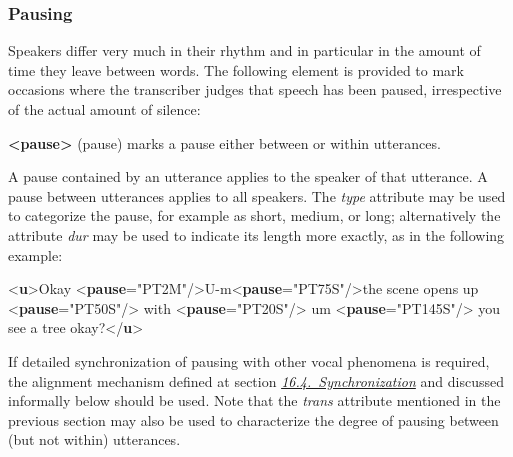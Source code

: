 \subsubsection[{Pausing}]{Pausing}\label{TSBAPA}\par
Speakers differ very much in their rhythm and in particular in the amount of time they leave between words. The following element is provided to mark occasions where the transcriber judges that speech has been paused, irrespective of the actual amount of silence: 
\begin{sansreflist}
  
\item [\textbf{<pause>}] (pause) marks a pause either between or within utterances.
\end{sansreflist}
 A pause contained by an utterance applies to the speaker of that utterance. A pause between utterances applies to all speakers. The {\itshape type} attribute may be used to categorize the pause, for example as short, medium, or long; alternatively the attribute {\itshape dur} may be used to indicate its length more exactly, as in the following example: \par\bgroup{}\exampleFont \begin{shaded}\noindent\mbox{}{<\textbf{u}>}Okay {<\textbf{pause}\hspace*{1em}{dur}="{PT2M}"/>}U-m{<\textbf{pause}\hspace*{1em}{dur}="{PT75S}"/>}the scene opens up\mbox{}\newline 
{<\textbf{pause}\hspace*{1em}{dur}="{PT50S}"/>} with {<\textbf{pause}\hspace*{1em}{dur}="{PT20S}"/>} um {<\textbf{pause}\hspace*{1em}{dur}="{PT145S}"/>} you see\mbox{}\newline 
 a tree okay?{</\textbf{u}>}\end{shaded}\egroup\par \noindent   If detailed synchronization of pausing with other vocal phenomena is required, the alignment mechanism defined at section \textit{\hyperref[SASY]{16.4.\ Synchronization}} and discussed informally below should be used. Note that the {\itshape trans} attribute mentioned in the previous section may also be used to characterize the degree of pausing between (but not within) utterances.

